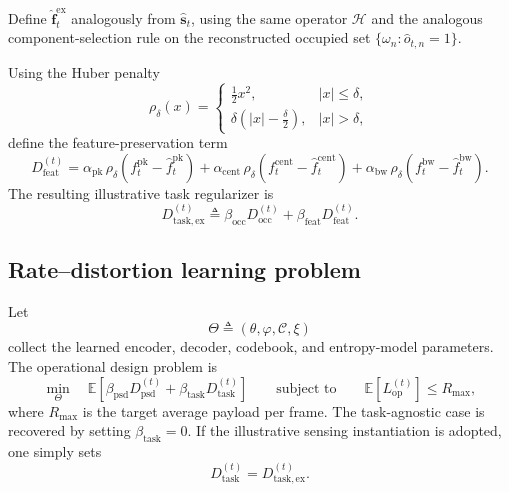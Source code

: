 \documentclass[11pt]{article}
\begin{document}
Define $\hat{\mathbf{f}}_{t}^{\mathrm{ex}}$ analogously from $\hat{\mathbf{s}}_t$, using the same
operator $\mathcal{H}$ and the analogous component-selection rule on the reconstructed occupied set
$\{\omega_n : \hat{o}_{t,n}=1\}$.

Using the Huber penalty
\begin{equation}
\rho_{\delta}(x)
=
\begin{cases}
\frac{1}{2}x^2, & |x| \le \delta,\\[1mm]
\delta\left(|x|-\frac{\delta}{2}\right), & |x| > \delta,
\end{cases}
\end{equation}
define the feature-preservation term
\begin{equation}
D_{\mathrm{feat}}^{(t)}
=
\alpha_{\mathrm{pk}}\,\rho_{\delta}(f_{t}^{\mathrm{pk}}-\hat{f}_{t}^{\mathrm{pk}})
+
\alpha_{\mathrm{cent}}\,\rho_{\delta}(f_{t}^{\mathrm{cent}}-\hat{f}_{t}^{\mathrm{cent}})
+
\alpha_{\mathrm{bw}}\,\rho_{\delta}(f_{t}^{\mathrm{bw}}-\hat{f}_{t}^{\mathrm{bw}}).
\end{equation}
The resulting illustrative task regularizer is
\begin{equation}
D_{\mathrm{task,ex}}^{(t)}
\triangleq
\beta_{\mathrm{occ}}D_{\mathrm{occ}}^{(t)}
+
\beta_{\mathrm{feat}}D_{\mathrm{feat}}^{(t)}.
\end{equation}

\subsection{Rate--distortion learning problem}
Let
\begin{equation}
\Theta \triangleq (\theta,\varphi,\mathcal{C},\xi)
\end{equation}
collect the learned encoder, decoder, codebook, and entropy-model parameters. The operational
design problem is
\begin{equation}
\min_{\Theta}
\quad
\mathbb{E}\!\left[
\beta_{\mathrm{psd}}D_{\mathrm{psd}}^{(t)}
+
\beta_{\mathrm{task}}D_{\mathrm{task}}^{(t)}
\right]
\qquad
\text{subject to}
\qquad
\mathbb{E}\!\left[L_{\mathrm{op}}^{(t)}\right] \le R_{\max},
\end{equation}
where $R_{\max}$ is the target average payload per frame. The task-agnostic case is recovered by
setting $\beta_{\mathrm{task}} = 0$. If the illustrative sensing instantiation is adopted, one simply
sets
\begin{equation}
D_{\mathrm{task}}^{(t)} = D_{\mathrm{task,ex}}^{(t)}.
\end{equation}
\end{document}
